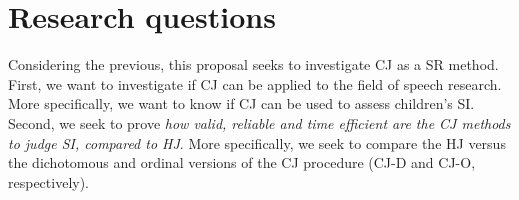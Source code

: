 \section{Research questions} \label{seq:rq}

Considering the previous, this proposal seeks to investigate CJ as a SR method. First, we want to investigate if CJ can be applied to the field of speech research. More specifically, we want to know if CJ can be used to assess children’s SI. Second, we seek to prove \textit{how valid, reliable and time efficient are the CJ methods to judge SI, compared to HJ}. More specifically, we seek to compare the HJ versus the dichotomous and ordinal versions of the CJ procedure (CJ-D and CJ-O, respectively).